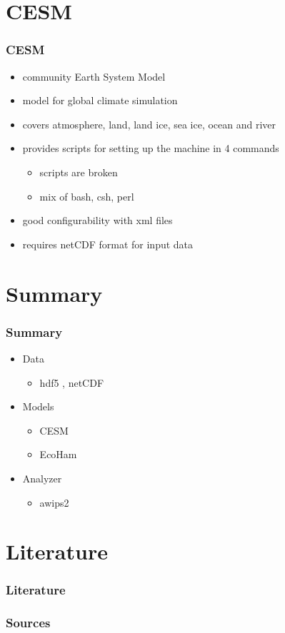 \documentclass[compress]{beamer}
\begin{document}
\section{CESM}
\begin{frame}
    \frametitle{CESM}
    	\begin{itemize}
    	    \item community Earth System Model
			\item model for global climate simulation
			\item covers atmosphere, land, land ice, sea ice, ocean and river
			\item provides scripts for setting up the machine in 4 commands
	    	\begin{itemize}
		    	\item scripts are broken
		    	\item mix of bash, csh, perl
		    \end{itemize}
		    \item good configurability with xml files
		    \item requires netCDF format for input data \cite{CESMDocs}
		\end{itemize}
\end{frame}


\section{Summary}

\begin{frame}
	\frametitle{Summary}

	\begin{itemize}
		\item Data

		\begin{itemize}
			\item hdf5 , netCDF
		\end{itemize}

		\item Models
		\begin{itemize}
			\item CESM
			\item EcoHam
		\end{itemize}
		\item Analyzer
		\begin{itemize}
		    \item awips2
		\end{itemize}
	\end{itemize}
\end{frame}

\section*{Literature}

\begin{frame}[allowframebreaks]
	\frametitle{Literature}
    \frametitle{Sources}

	
	
\end{frame}
\end{document}
